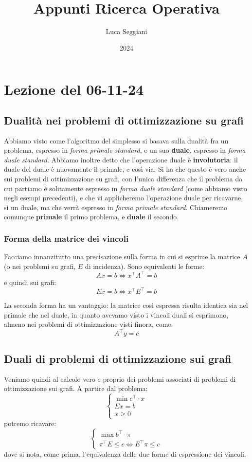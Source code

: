 \documentclass[a4paper,11pt]{article}
\title{Appunti Ricerca Operativa}
\author{Luca Seggiani}
\date{2024}
\begin{document}
\section{Lezione del 06-11-24}

\thispagestyle{empty}
\pagestyle{fancy}

\subsection{Dualità nei problemi di ottimizzazione su grafi}
Abbiamo visto come l'algoritmo del simplesso si basava sulla dualità fra un problema, espresso in \textit{forma primale standard}, e un suo \textbf{duale}, espresso in \textit{forma duale standard}.
Abbiamo inoltre detto che l'operazione duale è \textbf{involutoria}: il duale del duale è nuovamente il primale, e così via.
Si ha che questo è vero anche sui problemi di ottimizzazione su grafi, con l'unica differenza che il problema da cui partiamo è solitamente espresso in \textit{forma duale standard} (come abbiamo visto negli esempi precedenti), e che vi applicheremo l'operazione duale per ricavarne, sì un duale, ma che verrà espresso in \textit{forma primale standard}. 
Chiameremo comunque \textbf{primale} il primo problema, e \textbf{duale} il secondo.

\subsubsection{Forma della matrice dei vincoli}
Facciamo innanzitutto una precisazione sulla forma in cui si esprime la matrice $A$ (o nei problemi su grafi, $E$ di incidenza).
Sono equivalenti le forme:
$$
Ax = b \Leftrightarrow x^\intercal A^\intercal = b
$$
e quindi sui grafi:
$$
Ex = b \Leftrightarrow x^\intercal E^\intercal = b
$$

La seconda forma ha un vantaggio: la matrice così espressa risulta identica sia nel primale che nel duale, in quanto avevamo visto i vincoli duali si esprimono, almeno nei problemi di ottimizzazione visti finora, come:
$$
A^\intercal y = c
$$

\subsection{Duali di problemi di ottimizzazione sui grafi}
Veniamo quindi al calcolo vero e proprio dei problemi associati di problemi di ottimizzazione sui grafi.
A partire dal problema:
\[
	\begin{cases}
		\min c^\intercal \cdot x \\ 
		Ex = b \\ 
		x \geq 0
	\end{cases}
\]
potremo ricavare:
\[
	\begin{cases}
			\max b^\intercal \cdot \pi \\ 
			\pi^\intercal E \leq c \Leftrightarrow E^\intercal\pi \leq c
	\end{cases}
\]
dove si nota, come prima, l'equivalenza delle due forme di espressione dei vincoli.
\end{document}
